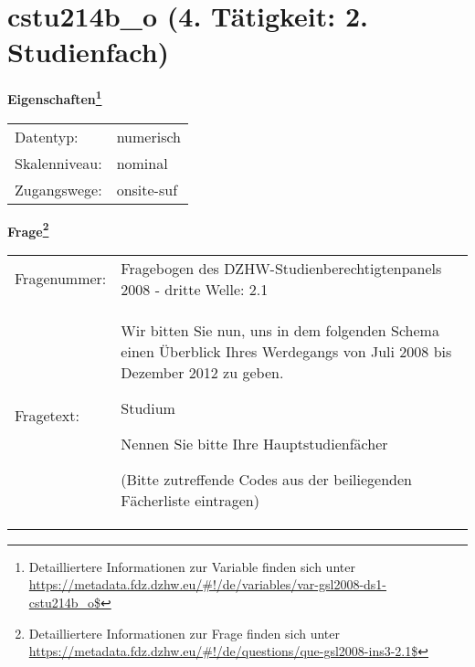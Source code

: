
    \setcounter{footnote}{0}

    \vspace*{-1.8cm}
	\section{cstu214b\_o (4. Tätigkeit: 2. Studienfach)}
	\label{section:cstu214b_o}



    \vspace*{0.5cm}
    \noindent\textbf{Eigenschaften\footnote{Detailliertere Informationen zur Variable finden sich unter
		\url{https://metadata.fdz.dzhw.eu/\#!/de/variables/var-gsl2008-ds1-cstu214b_o$}}}\\
	\begin{tabularx}{\hsize}{@{}lX}
	Datentyp: & numerisch \\
	Skalenniveau: & nominal \\
	Zugangswege: &
	  onsite-suf
 \\
    \end{tabularx}



				\vspace*{0.5cm}
                \noindent\textbf{Frage\footnote{Detailliertere Informationen zur Frage finden sich unter
		              \url{https://metadata.fdz.dzhw.eu/\#!/de/questions/que-gsl2008-ins3-2.1$}}}\\
				\begin{tabularx}{\hsize}{@{}lX}
					Fragenummer: &
					  Fragebogen des DZHW-Studienberechtigtenpanels 2008 - dritte Welle:
					  2.1
 \\
					Fragetext: & Wir bitten Sie nun, uns in dem folgenden Schema einen Überblick Ihres Werdegangs von Juli 2008 bis Dezember 2012 zu geben.\par  Studium\par  Nennen Sie bitte Ihre Hauptstudienfächer\par  (Bitte zutreffende Codes aus der beiliegenden Fächerliste eintragen) \\
				\end{tabularx}






